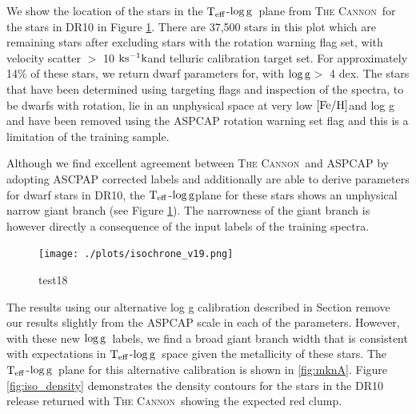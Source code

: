 \documentclass[12pt, preprint]{aastex}
\newcommand{\sectionname}{Section}
\newcommand{\teff}{\mbox{$\rm T_{eff}$}}
\newcommand{\kms}{\mbox{$\rm ks^{-1} k$}}
\newcommand{\feh}{\mbox{$\rm [Fe/H]$}}
\newcommand{\logg}{\mbox{$\rm \log g$}}
\newcommand{\tc}{\textsc{The Cannon}}
\begin{document}
We show the location of the stars in the \teff-\logg\ plane from \tc\ for the stars in DR10 in Figure \ref{fig:test18}. There are 37,500 stars in this plot which are remaining stars after excluding stars with the  rotation warning flag set, with velocity scatter $>$ 10 \kms and telluric calibration target set. For approximately 14\% of these stars, we return dwarf parameters for, with \logg $>$ 4 dex.  The stars that have been determined using targeting flags and inspection of the spectra, to be dwarfs with rotation, lie in an unphysical space at very low \feh and log g and have been removed using the ASPCAP rotation warning set flag and this is a limitation of the training sample. 

Although we find excellent agreement between \tc\ and ASPCAP by adopting ASCPAP corrected labels and additionally are able to derive parameters for dwarf stars in DR10, the \teff-\logg plane for these stars shows an unphysical narrow giant branch  (see Figure \ref{fig:test18}). The narrowness of the giant branch is however directly a consequence of the input labels of the training spectra. 


\begin{figure}[h!]
  \texttt{[image: ./plots/isochrone\_v19.png]}
\caption{test18}
\label{fig:test18}
\end{figure}

The results using our alternative log g calibration described in \sectionname{} remove our results slightly from the ASPCAP scale in each of the parameters. However, with these new \logg\ labels, we find a broad giant branch width that is consistent with expectations in \teff-\logg\ space given the metallicity of these stars. The \teff-\logg\ plane for this alternative calibration is shown in \ref{fig:mknA}. Figure \ref{fig:iso_density} demonstrates the density contours for the stars in the DR10 release returned with \tc\, showing the expected red clump. 

\end{document}
